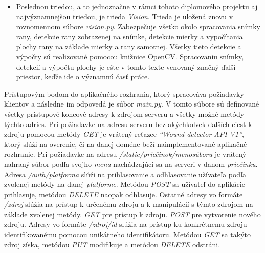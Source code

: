 \begin{itemize}
\item Poslednou triedou, a to jednoznačne v rámci tohoto diplomového projektu aj najvýznamnejšou triedou, je trieda \textit{Vision}. Trieda je uložená znovu v rovnomennom súbore \textit{vision.py}. Zabezpečuje všetko okolo spracovania snímky rany, detekcie rany zobrazenej na snímke, detekcie mierky a vypočítania plochy rany na základe mierky a rany samotnej. Všetky tieto detekcie a výpočty sú realizované pomocou knižnice OpenCV. Spracovaniu snímky, detekcií a výpočtu plochy je ešte v tomto texte venovaný značný ďalší priestor, keďže ide o významnú časť práce.
\end{itemize}

Prístupovým bodom do aplikačného rozhrania, ktorý spracováva požiadavky klientov a následne im odpovedá je súbor \textit{main.py}. V tomto súbore sú definované všetky prístupové koncové adresy k zdrojom serveru a všetky možné metódy týchto adries. Pri požiadavke na adresu serveru bez akýchkoľvek ďalších ciest k zdroju pomocou metódy \textit{GET}  je vrátený reťazec \textit{“Wound detector API V1”}, ktorý slúži na overenie, či na danej doméne beží naimplementované aplikačné rozhranie. Pri požiadavke na adresu \textit{/static/priečinok/menosúboru} je vrátený nahraný súbor podľa svojho \textit{mena} nachádzajúci sa na serveri v danom \textit{priečinku}. Adresa \textit{/auth/platforma} slúži na prihlasovanie a odhlasovanie užívateľa podľa zvolenej metódy na danej \textit{platforme}. Metódou \textit{POST} sa užívateľ do aplikácie prihlasuje, metódou \textit{DELETE} naopak odhlasuje. Ostatné adresy vo formáte \textit{/zdroj} slúžia na prístup k určenému zdroju a k manipulácií s týmto zdrojom na základe zvolenej metódy. \textit{GET} pre prístup k zdroju. \textit{POST} pre vytvorenie nového zdroju. Adresy vo formáte \textit{/zdroj/id} slúžia na prístup ku konkrétnemu zdroju identifikovanému pomocou unikátneho identifikátoru. Metódou \textit{GET} sa takýto zdroj získa, metódou \textit{PUT} modifikuje a metódou \textit{DELETE} odstráni. 


